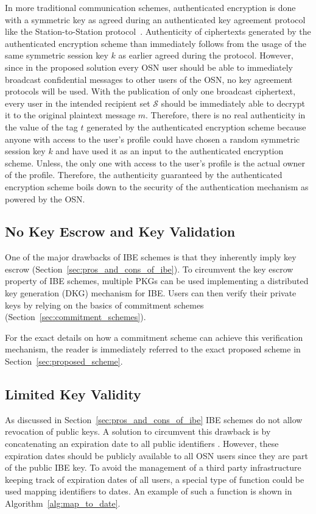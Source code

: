 In more traditional communication schemes, authenticated encryption is done with a symmetric key as agreed during an authenticated key agreement protocol like the Station-to-Station protocol~\cite{art:DiffieOW92}. Authenticity of ciphertexts generated by the authenticated encryption scheme than immediately follows from the usage of the same symmetric session key $k$ as earlier agreed during the protocol. However, since in the proposed solution every OSN user should be able to immediately broadcast confidential messages to other users of the OSN, no key agreement protocols will be used. With the publication of only one broadcast ciphertext, every user in the intended recipient set $\mathcal{S}$ should be immediately able to decrypt it to the original plaintext message $m$. Therefore, there is no real authenticity in the value of the tag $t$ generated by the authenticated encryption scheme because anyone with access to the user's profile could have chosen a random symmetric session key $k$ and have used it as an input to the authenticated encryption scheme. Unless, the only one with access to the user's profile is the actual owner of the profile. Therefore, the authenticity guaranteed by the authenticated encryption scheme boils down to the security of the authentication mechanism as powered by the OSN.


\subsection{No Key Escrow and Key Validation}
One of the major drawbacks of IBE schemes is that they inherently imply key escrow (Section~\ref{sec:pros_and_cons_of_ibe}). To circumvent the key escrow property of IBE schemes, multiple PKGs can be used implementing a distributed key generation (DKG) mechanism for IBE. Users can then verify their private keys by relying on the basics of commitment schemes (Section~\ref{sec:commitment_schemes}).

For the exact details on how a commitment scheme can achieve this verification mechanism, the reader is immediately referred to the exact proposed scheme in Section~\ref{sec:proposed_scheme}.

\subsection{Limited Key Validity}
As discussed in Section~\ref{sec:pros_and_cons_of_ibe} IBE schemes do not allow revocation of public keys. A solution to circumvent this drawback is by concatenating an expiration date to all public identifiers \id{}. However, these expiration dates should be publicly available to all OSN users since they are part of the public IBE key. To avoid the management of a third party infrastructure keeping track of expiration dates of all users, a special type of function could be used mapping identifiers \id{} to dates. An example of such a function is shown in Algorithm~\ref{alg:map_to_date}.

